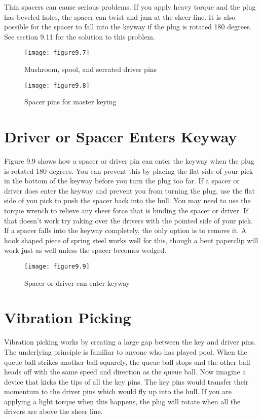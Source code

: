 Thin spacers can cause serious problems. If you apply heavy torque and the plug has
beveled holes, the spacer can twist and jam at the sheer line. It is also possible for the spacer
to fall into the keyway if the plug is rotated 180 degrees. See section 9.11 for the solution to
this problem.

\begin{figure}
    \texttt{[image: figure9.7]}
    \caption{Mushroom, spool, and serrated driver pins}
\end{figure}

\begin{figure}
    \texttt{[image: figure9.8]}
    \caption{Spacer pins for master keying}
\end{figure}

\section{Driver or Spacer Enters Keyway}

Figure 9.9 shows how a spacer or driver pin can enter the keyway when the plug is rotated
180 degrees. You can prevent this by placing the flat side of your pick in the bottom of the
keyway before you turn the plug too far. If a spacer or driver does enter the keyway and
prevent you from turning the plug, use the flat side of you pick to push the spacer back into
the hull. You may need to use the torque wrench to relieve any sheer force that is binding
the spacer or driver. If that doesn't work try raking over the drivers with the pointed side
of your pick. If a spacer falls into the keyway completely, the only option is to remove it. A
hook shaped piece of spring steel works well for this, though a bent paperclip will work just
as well unless the spacer becomes wedged.

\begin{figure}
    \texttt{[image: figure9.9]}
    \caption{Spacer or driver can enter keyway}
\end{figure}

\section{Vibration Picking}
Vibration picking works by creating a large gap between the key and driver pins. The
underlying principle is familiar to anyone who has played pool. When the queue ball strikes
another ball squarely, the queue ball stops and the other ball heads off with the same speed
and direction as the queue ball. Now imagine a device that kicks the tips of all the key pins.
The key pins would transfer their momentum to the driver pins which would fly up into the
hull. If you are applying a light torque when this happens, the plug will rotate when all the
drivers are above the sheer line.

